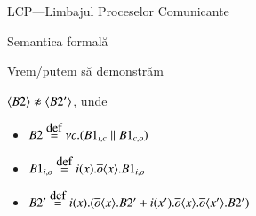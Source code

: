 \documentclass[xcolor=pdftex,romanian,colorlinks]{beamer}
\begin{document}
\begin{section}{LCP—Limbajul Proceselor Comunicante}
\begin{subsection}{Semantica formală}
\begin{frame}{Vrem/putem să demonstrăm}
\begin{itemize}
\vitem ${\langle{B2}\rangle} \not\approx {\ensuremath \langle{B2'}\rangle}$, unde
\begin{itemize}
\item[] $B2 \stackrel{\mbox{def}}{=} \nu c. (B1_{i,c} \parallel B1_{c,o})$
\item[] $B1_{i,o} \stackrel{\mbox{def}}{=} i(x).\overline{o}\langle{x}\rangle.B1_{i,o}$
\item[] $B2' \stackrel{\mbox{def}}{=} i(x).(\overline{o}\langle{x}\rangle.B2' + i(x').\overline{o}\langle{x}\rangle.\overline{o}\langle{x'}\rangle.B2')$

\end{itemize}
\end{itemize}
\end{frame}

\end{subsection}

\end{section}
\end{document}
